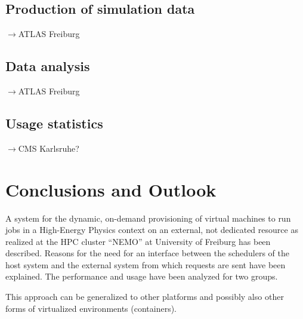 \subsection{Production of simulation data}
$\to$ATLAS Freiburg
\subsection{Data analysis}
$\to$ATLAS Freiburg 

\subsection{Usage statistics}
$\to$CMS Karlsruhe?

\section{Conclusions and Outlook}


A system for the dynamic, on-demand provisioning of virtual machines
to run jobs in a High-Energy Physics context on an external, not
dedicated resource as realized at the HPC
cluster ``NEMO'' at University of Freiburg has been described. 
Reasons for the need for an interface between the schedulers of the host system
and the external system from which requests are sent have been
explained. 
The performance and usage have been analyzed for two groups. 

This approach can be generalized to other platforms and possibly also
other forms of virtualized environments (containers).

















